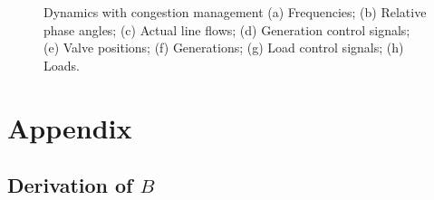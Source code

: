 \documentclass[journal,12pt,onecolumn,draftclsnofoot]{IEEEtran}
\begin{document}
\begin{figure}[]
{}
	\caption{Dynamics with congestion management (a) Frequencies; (b) Relative phase angles; (c) Actual line flows; (d) Generation control signals; (e) Valve positions; (f) Generations; (g) Load control signals; (h) Loads.}
	\label{fig:Wcongestion}
\end{figure}








\newpage
\appendix
\section{Appendix}

\subsection{Derivation of $B$}
\end{document}
